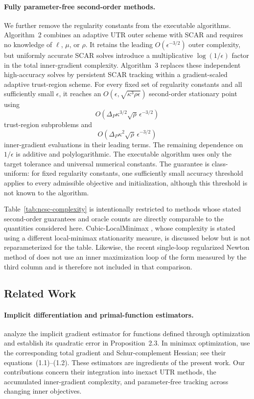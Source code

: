 \paragraph{Fully parameter-free second-order methods.}
We further remove the regularity constants from the executable
algorithms. Algorithm~2 combines an adaptive UTR outer scheme with
SCAR and requires no knowledge of $\ell$, $\mu$, or $\rho$. It retains
the leading $O(\epsilon^{-3/2})$ outer complexity, but uniformly
accurate SCAR solves introduce a multiplicative $\log(1/\epsilon)$
factor in the total inner-gradient complexity. Algorithm~3 replaces
these independent high-accuracy solves by persistent SCAR tracking
within a gradient-scaled adaptive trust-region scheme. For every fixed
set of regularity constants and all sufficiently small $\epsilon$, it
reaches an
$O(\epsilon,\sqrt{\kappa^3\rho\epsilon})$ second-order stationary
point using
\[
    O\!\left(
        \Delta_P\kappa^{3/2}\sqrt{\rho}\,
        \epsilon^{-3/2}
    \right)
\]
trust-region subproblems and
\[
    O\!\left(
        \Delta_P\kappa^2\sqrt{\rho}\,
        \epsilon^{-3/2}
    \right)
\]
inner-gradient evaluations in their leading terms. The remaining
dependence on $1/\epsilon$ is additive and polylogarithmic. The
executable algorithm uses only the target tolerance and universal
numerical constants. The guarantee is class-uniform: for fixed
regularity constants, one sufficiently small accuracy threshold
applies to every admissible objective and initialization, although
this threshold is not known to the algorithm.




Table~\ref{tab:ncsc-complexity} is intentionally restricted to methods
whose stated second-order guarantees and oracle counts are directly
comparable to the quantities considered here.
Cubic-LocalMinimax \citep{chen2023cubic}, whose complexity is stated
using a different local-minimax stationarity measure, is discussed
below but is not reparameterized for the table.
Likewise, the recent single-loop regularized Newton method of
\citet{ma2026singleloop} does not use an inner maximization loop of the
form measured by the third column and is therefore not included in
that comparison.


\subsection{Related Work}

\paragraph{Implicit differentiation and primal-function estimators.}
\citet{ablin2020superefficiency} analyze the implicit gradient
estimator for functions defined through optimization and establish
its quadratic error in Proposition~2.3.
In minimax optimization, \citet{zhang2020newton} use the corresponding
total gradient and Schur-complement Hessian; see their
equations~(1.1)--(1.2).
These estimators are ingredients of the present work.
Our contributions concern their integration into inexact UTR methods,
the accumulated inner-gradient complexity, and parameter-free
tracking across changing inner objectives.


